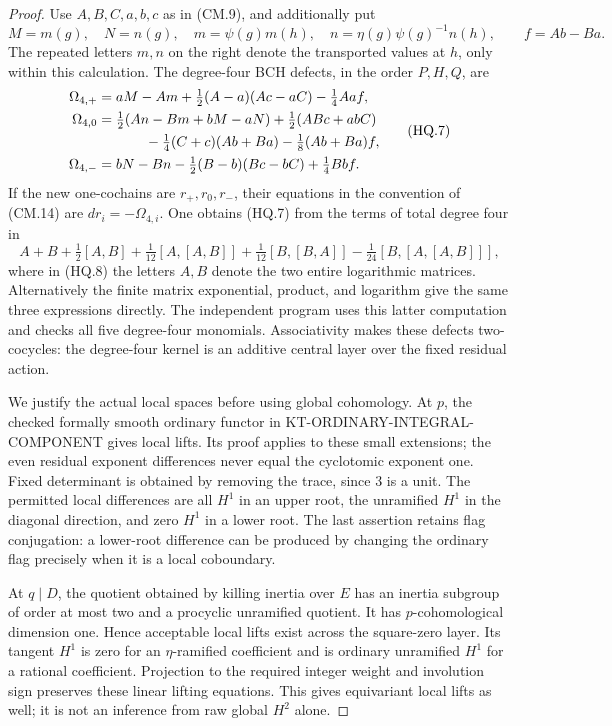 \documentclass[11pt,a4paper]{article}
\theoremstyle{definition}
\begin{document}
\begin{proof}
Use \(A,B,C,a,b,c\) as in (CM.9), and additionally put
\[
 M=m(g),\quad N=n(g),\quad
 m=\psi(g)m(h),\quad n=\eta(g)\psi(g)^{-1}n(h),
 \qquad f=Ab-Ba.
                                                        \tag{HQ.6}
\]
The repeated letters \(m,n\) on the right denote the
transported values at \(h\), only within this calculation.
The degree-four BCH defects, in the order \(P,H,Q\), are
\[
\begin{split}
 \Omega_{4,+}
   & =aM-Am+\tfrac12(A-a)(Ac-aC)-\tfrac14Aa f,\\
 \Omega_{4,0}
   & =\tfrac12(An-Bm+bM-aN)+\tfrac12(ABc+abC)\\
   &\hspace{12mm}-\tfrac14(C+c)(Ab+Ba)-\tfrac18(Ab+Ba)f,\\
 \Omega_{4,-}
   & =bN-Bn-\tfrac12(B-b)(Bc-bC)+\tfrac14Bb f.
\end{split}                                               \tag{HQ.7}
\]
If the new one-cochains are \(r_+,r_0,r_-\), their
equations in the convention of (CM.14) are
\(dr_i=-\Omega_{4,i}\).
One obtains (HQ.7) from the terms of total degree four in
\[
 A+B+\tfrac12[A,B]+\tfrac1{12}[A,[A,B]]
 +\tfrac1{12}[B,[B,A]]-\tfrac1{24}[B,[A,[A,B]]],
                                                        \tag{HQ.8}
\]
where in (HQ.8) the letters \(A,B\) denote the two
entire logarithmic matrices.  Alternatively the finite
matrix exponential, product, and logarithm give the same
three expressions directly.  The independent program
 uses this latter computation
and checks all five degree-four monomials.
Associativity makes these defects two-cocycles: the
degree-four kernel is an additive central layer over
the fixed residual action.

We justify the actual local spaces before using global
cohomology.  At \(p\), the checked formally smooth
ordinary functor in KT-ORDINARY-INTEGRAL-COMPONENT gives
local lifts.  Its proof applies to these small extensions;
the even residual exponent differences never equal the
cyclotomic exponent one.  Fixed determinant is obtained
by removing the trace, since \(3\) is a unit.
The permitted local differences are all \(H^1\) in
an upper root, the unramified \(H^1\) in the diagonal
direction, and zero \(H^1\) in a lower root.  The last
assertion retains flag conjugation: a lower-root
difference can be produced by changing the ordinary
flag precisely when it is a local coboundary.

At \(q\mid D\), the quotient obtained by killing
inertia over \(E\) has an inertia subgroup of order
at most two and a procyclic unramified quotient.
It has \(p\)-cohomological dimension one.  Hence
acceptable local lifts exist across the square-zero
layer.  Its tangent \(H^1\) is zero for an
\(\eta\)-ramified coefficient and is ordinary
unramified \(H^1\) for a rational coefficient.
Projection to the required integer weight and
involution sign preserves these linear lifting
equations.  This gives equivariant local lifts as
well; it is not an inference from raw global
\(H^2\) alone.


\end{proof}
\end{document}
